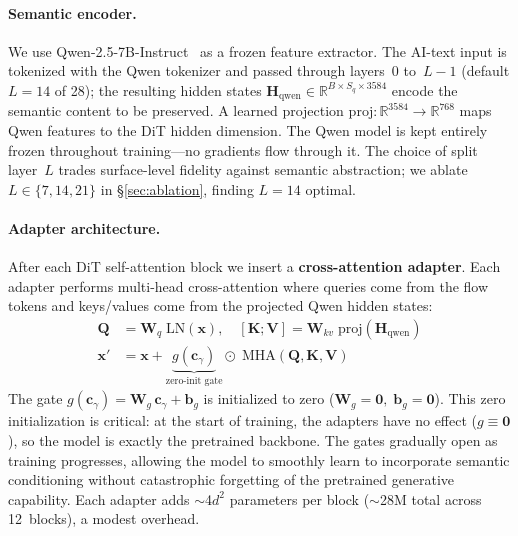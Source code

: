 \paragraph{Semantic encoder.}
We use Qwen-2.5-7B-Instruct~\citep{qwen2024qwen25} as a frozen
feature extractor.
The AI-text input is tokenized with the Qwen tokenizer and
passed through layers~$0$ to~$L{-}1$
(default $L{=}14$ of 28); the resulting hidden states
$\mathbf{H}_{\mathrm{qwen}}
  \!\in\! \mathbb{R}^{B \times S_q \times 3584}$
encode the semantic content to be preserved.
A learned projection
$\mathrm{proj}\!:\!\mathbb{R}^{3584}{\to}\mathbb{R}^{768}$
maps Qwen features to the DiT hidden dimension.
The Qwen model is kept entirely frozen throughout training---no
gradients flow through it.
The choice of split layer~$L$ trades surface-level fidelity
against semantic abstraction; we ablate
$L\!\in\!\{7,14,21\}$ in \S\ref{sec:ablation}, finding
$L{=}14$ optimal.

\paragraph{Adapter architecture.}
After each DiT self-attention block we insert a
\textbf{cross-attention adapter}.
Each adapter performs multi-head cross-attention where queries
come from the flow tokens and keys/values come from the
projected Qwen hidden states:
\begin{align}
    \mathbf{Q} &= \mathbf{W}_q\;\mathrm{LN}(\mathbf{x}),
    \quad
    [\mathbf{K};\mathbf{V}]
      = \mathbf{W}_{kv}\;\mathrm{proj}(\mathbf{H}_{\mathrm{qwen}})
    \label{eq:cross-kv}\\[2pt]
    \mathbf{x}'
      &= \mathbf{x}
       + \underbrace{g(\mathbf{c}_\gamma)}_{\text{zero-init gate}}
         \!\odot\;
         \mathrm{MHA}(\mathbf{Q},\mathbf{K},\mathbf{V})
    \label{eq:cross-gate}
\end{align}
The gate
$g(\mathbf{c}_\gamma)
  = \mathbf{W}_g\,\mathbf{c}_\gamma + \mathbf{b}_g$
is initialized to zero
($\mathbf{W}_g{=}\mathbf{0},\;\mathbf{b}_g{=}\mathbf{0}$).
This zero initialization is critical: at the start of training,
the adapters have no effect ($g \equiv \mathbf{0}$), so the
model is exactly the pretrained backbone.
The gates gradually open as training progresses, allowing the
model to smoothly learn to incorporate semantic conditioning
without catastrophic forgetting of the pretrained generative
capability.
Each adapter adds $\sim$4$d^2$ parameters per block
($\sim$28M total across 12~blocks), a modest overhead.

